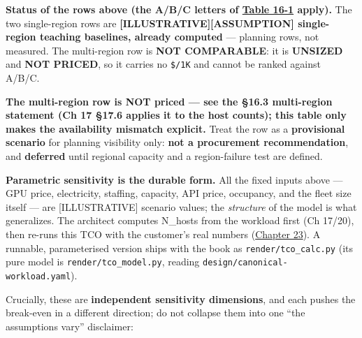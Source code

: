\textbf{Status of the rows above (the A/B/C letters of \hyperref[tab:16.1]{Table 16-1}
apply).} The two single-region rows are
\textbf{\mbox{{[}ILLUSTRATIVE{]}}\hspace{0pt}\mbox{{[}ASSUMPTION{]}} single-region teaching
baselines, already computed} --- planning rows, not measured. The
multi-region row is \textbf{NOT COMPARABLE}: it is \textbf{UNSIZED} and
\textbf{NOT PRICED}, so it carries no \texttt{\$/1K} and cannot be
ranked against A/B/C.

\textbf{The multi-region row is NOT priced --- see the §16.3
multi-region statement (Ch 17 §17.6 applies it to the host counts); this
table only makes the availability mismatch explicit.} Treat the row as a
\textbf{provisional scenario} for planning visibility only: \textbf{not
a procurement recommendation}, and \textbf{deferred} until regional
capacity and a region-failure test are defined.

\textbf{Parametric sensitivity is the durable form.} All the fixed
inputs above --- GPU price, electricity, staffing, capacity, API price,
occupancy, and the fleet size itself --- are \mbox{{[}ILLUSTRATIVE{]}} scenario
values; the \emph{structure} of the model is what generalizes. The
architect computes N\_hosts from the workload first (Ch 17/20), then
re-runs this TCO with the customer's real numbers (\hyperref[chap:23]{Chapter 23}). A
runnable, parameterised version ships with the book as
\texttt{render/tco\_calc.py} (its pure model is
\texttt{render/tco\_model.py}, reading
\texttt{design/canonical-workload.yaml}).

Crucially, these are \textbf{independent sensitivity dimensions}, and
each pushes the break-even in a different direction; do not collapse
them into one ``the assumptions vary'' disclaimer:


